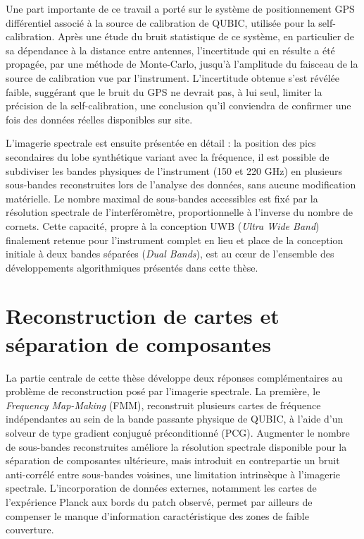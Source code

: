 Une part importante de ce travail a porté sur le système de positionnement GPS différentiel associé à la source de calibration de QUBIC, utilisée pour la self-calibration. Après une étude du bruit statistique de ce système, en particulier de sa dépendance à la distance entre antennes, l'incertitude qui en résulte a été propagée, par une méthode de Monte-Carlo, jusqu'à l'amplitude du faisceau de la source de calibration vue par l'instrument. L'incertitude obtenue s'est révélée faible, suggérant que le bruit du GPS ne devrait pas, à lui seul, limiter la précision de la self-calibration, une conclusion qu'il conviendra de confirmer une fois des données réelles disponibles sur site.

L'imagerie spectrale est ensuite présentée en détail : la position des pics secondaires du lobe synthétique variant avec la fréquence, il est possible de subdiviser les bandes physiques de l'instrument (150 et 220 GHz) en plusieurs sous-bandes reconstruites lors de l'analyse des données, sans aucune modification matérielle. Le nombre maximal de sous-bandes accessibles est fixé par la résolution spectrale de l'interféromètre, proportionnelle à l'inverse du nombre de cornets. Cette capacité, propre à la conception UWB (\emph{Ultra Wide Band}) finalement retenue pour l'instrument complet en lieu et place de la conception initiale à deux bandes séparées (\emph{Dual Bands}), est au cœur de l'ensemble des développements algorithmiques présentés dans cette thèse.

\section*{Reconstruction de cartes et séparation de composantes}

La partie centrale de cette thèse développe deux réponses complémentaires au problème de reconstruction posé par l'imagerie spectrale. La première, le \emph{Frequency Map-Making} (FMM), reconstruit plusieurs cartes de fréquence indépendantes au sein de la bande passante physique de QUBIC, à l'aide d'un solveur de type gradient conjugué préconditionné (PCG). Augmenter le nombre de sous-bandes reconstruites améliore la résolution spectrale disponible pour la séparation de composantes ultérieure, mais introduit en contrepartie un bruit anti-corrélé entre sous-bandes voisines, une limitation intrinsèque à l'imagerie spectrale. L'incorporation de données externes, notamment les cartes de l'expérience Planck aux bords du patch observé, permet par ailleurs de compenser le manque d'information caractéristique des zones de faible couverture.

